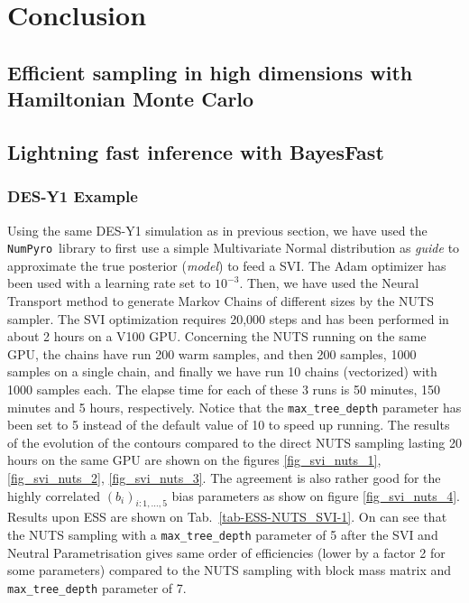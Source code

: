\documentclass[final,5p,times,twocolumn,authoryear]{elsarticle}
\newcommand{\numpyro}{\texttt{NumPyro}}
\begin{document}
\section{Conclusion}


\subsection{Efficient sampling in high dimensions with Hamiltonian Monte Carlo}



\subsection{Lightning fast inference with BayesFast}

%
%
\subsubsection{DES-Y1 Example}
%
Using the same DES-Y1 simulation as in previous section, we have used the \numpyro\ library to first use a simple Multivariate Normal distribution as \textit{guide} to approximate the true posterior (\textit{model}) to feed a SVI. The Adam optimizer has been used with a learning rate set to $10^{-3}$.  Then, we have used the Neural Transport method to generate Markov Chains of different sizes by the NUTS sampler. The SVI optimization requires 20,000 steps and has been performed in about 2 hours on a V100 GPU. Concerning the NUTS running on the same GPU, the chains have run 200 warm samples, and then 200 samples, 1000 samples on a single chain, and finally we have run 10 chains (vectorized) with 1000 samples each. The elapse time for each of these 3 runs is 50 minutes, 150 minutes and 5 hours, respectively. Notice that the \texttt{max\_tree\_depth} parameter has been set to 5 instead of the default value of 10 to speed up running. The results of the evolution of the contours compared to the direct NUTS sampling lasting 20 hours on the same GPU are shown on the figures \ref{fig_svi_nuts_1}, \ref{fig_svi_nuts_2}, \ref{fig_svi_nuts_3}. The  agreement is also rather good for the highly correlated $(b_i)_{i:1,\dots,5}$ bias parameters as show on figure \ref{fig_svi_nuts_4}. Results upon ESS are shown on Tab.~\ref{tab-ESS-NUTS_SVI-1}. On can see that the NUTS sampling with a \texttt{max\_tree\_depth} parameter of 5 after the SVI and Neutral Parametrisation gives same order of efficiencies (lower by a factor 2 for some parameters) compared to the NUTS sampling with block mass matrix and \texttt{max\_tree\_depth} parameter of 7.
\end{document}

